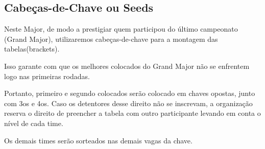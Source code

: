 \subsection{Cabeças-de-Chave ou Seeds}

Neste Major, de modo a prestigiar quem participou do último campeonato (Grand Major), utilizaremos cabeças-de-chave para a montagem das tabelas(brackets).

Isso garante com que os melhores colocados do Grand Major não se enfrentem logo nas primeiras rodadas.

Portanto, primeiro e segundo colocados serão colocado em chaves opostas, junto com 3os e 4os. Caso os detentores desse direito não se inscrevam, a organização reserva o direito de preencher a tabela com outro participante levando em conta o nível de cada time.

Os demais times serão sorteados nas demais vagas da chave.